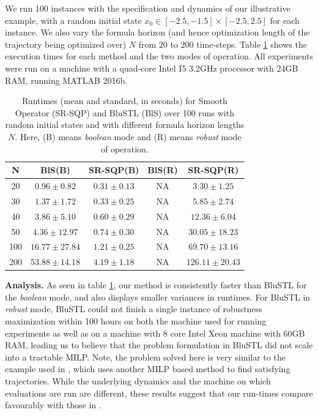 We run 100 instances with the specification and dynamics of our illustrative example, with a random initial state $x_0 \in [-2.5,-1.5] \times [-2.5,2.5]$ for each instance. We also vary the formula horizon (and hence optimization length of the trajectory being optimized over) $N$ from $20$ to $200$ time-steps. Table \ref{tbl:time_performance_toy} shows the execution times for each method and the two modes of operation. All experiments were run on a machine with a quad-core Intel I5 3.2GHz processor with 24GB RAM, running MATLAB 2016b.


\begin{table}[tb]
\small
\begin{center}
\caption{{\small Runtimes (mean and standard, in seconds) for Smooth Operator (SR-SQP) and BluSTL (BlS) over 100 runs with random initial states and with different formula horizon lengths $N$. Here, (B) means \textit{boolean} mode and (R) means \textit{robust} mode of operation.}}
\vspace{-5pt}
\label{tbl:time_performance_toy}
\begin{tabular} {|c|c|c|c|c|}
	\hline
	N & BlS(B) & SR-SQP(B) & BlS(R) & SR-SQP(R) \\ \hline
	20 & $0.96 \pm 0.82$ &  $\mathbf{0.31 \pm 0.13}$  & NA & $3.30 \pm 1.25$ \\ \hline
	30 & $1.37 \pm 1.72$ &  $\mathbf{0.33 \pm 0.25}$  & NA & $5.85 \pm 2.74$\\ \hline
	40 & $3.86 \pm 5.10$ &  $\mathbf{0.60 \pm 0.29}$  & NA & $12.36 \pm 6.04$\\ \hline
	50 & $4.36 \pm 12.97$&  $\mathbf{0.74 \pm 0.30}$ & NA & $30.05 \pm 18.23$\\ \hline
	100& $16.77 \pm 27.84$ & $\mathbf{1.21 \pm 0.25}$ & NA & $69.70 \pm 13.16$ \\ \hline
	200& $53.88 \pm 14.18$& $\mathbf{4.19 \pm 1.18}$ & NA & $126.11 \pm 20.43$ \\ \hline
\end{tabular}	
\end{center}
\end{table}

\textbf{Analysis.}
As seen in table \ref{tbl:time_performance_toy}, our method is consistently faster than BluSTL for the \textit{boolean} mode, and also displays smaller variances in runtimes. For BluSTL in \textit{robust} mode, BluSTL could not finish a single instance of robustness maximization within 100 hours on both the machine used for running experiments as well as on a machine with 8 core Intel Xeon machine with 60GB RAM, leading us to believe that the problem formulation in BluSTL did not scale into a tractable MILP. Note, the problem solved here is very similar to the example used in \cite{Saha_acc16}, which uses another MILP based method to find satisfying trajectories. While the underlying dynamics and the machine on which evaluations are run are different, these results suggest that our run-times compare favourably with those in \cite{Saha_acc16}.


